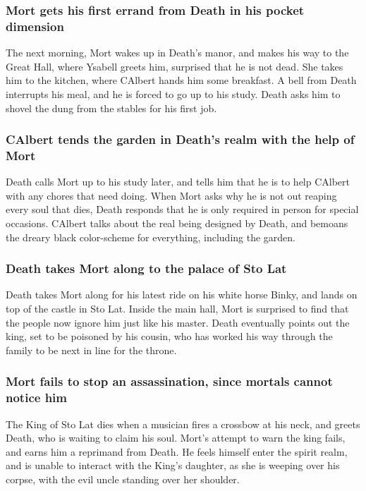 \subsubsection{\Gls{Mort} gets his first errand from \Gls{Death} in his pocket dimension}
The next morning, \Gls{Mort} wakes up in \Gls{Death}'s manor, and makes his way to the Great Hall,
where \Gls{Ysabell} greets him, surprised that he is not dead. She takes him to the kitchen, where
\Gls{CAlbert} hands him some breakfast. A bell from \Gls{Death} interrupts his meal, and he is
forced to go up to his study. \Gls{Death} asks him to shovel the dung from the stables for his
first job.

\subsubsection{\Gls{CAlbert} tends the garden in \Gls{Death}'s realm with the help of \Gls{Mort}}
\Gls{Death} calls \Gls{Mort} up to his study later, and tells him that he is to help \Gls{CAlbert}
with any chores that need doing. When \Gls{Mort} asks why he is not out reaping every soul that
dies, \Gls{Death} responds that he is only required in person for special occasions. \Gls{CAlbert}
talks about the real being designed by \Gls{Death}, and bemoans the dreary black color-scheme
for everything, including the garden.

\subsubsection{\Gls{Death} takes \Gls{Mort} along to the palace of Sto Lat}
\Gls{Death} takes \Gls{Mort} along for his latest ride on his white horse \Gls{Binky}, and lands
on top of the castle in Sto Lat. Inside the main hall, \Gls{Mort} is surprised to find that the
people now ignore him just like his master. \Gls{Death} eventually points out the king, set to be
poisoned by his cousin, who has worked his way through the family to be next in line for the
throne.

\subsubsection{\Gls{Mort} fails to stop an assassination, since mortals cannot notice him}
The King of Sto Lat dies when a musician fires a crossbow at his neck, and greets \Gls{Death}, who
is waiting to claim his soul. \Gls{Mort}'s attempt to warn the king fails, and earns him a reprimand
from \Gls{Death}. He feels himself enter the spirit realm, and is unable to interact with the King's
daughter, as she is weeping over his corpse, with the evil uncle standing over her shoulder.

